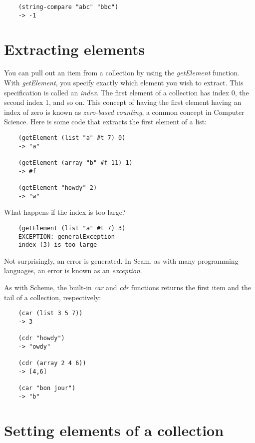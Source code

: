 \begin{verbatim}
    (string-compare "abc" "bbc")
    -> -1
\end{verbatim}

\section{Extracting elements}

You can pull out an item from a collection
by using the
{\it getElement} function.
With {\it getElement},
you specify exactly which element
you wish to extract. This specification is called an
{\it index}. The first element of a collection has index 0, the second
index 1, and so on. This concept of having the first element having
an index of zero is known as {\it zero-based counting}, a common concept
in Computer Science. Here is some code that extracts the first element
of a list:

\begin{verbatim}
    (getElement (list "a" #t 7) 0)
    -> "a"

    (getElement (array "b" #f 11) 1)
    -> #f

    (getElement "howdy" 2)
    -> "w"
\end{verbatim}

What happens if the index is too large?

\begin{verbatim}
    (getElement (list "a" #t 7) 3)
    EXCEPTION: generalException
    index (3) is too large
\end{verbatim}

Not surprisingly, an error is generated.
In Scam, as with many programming languages, an error is known
as an {\it exception}.

As with Scheme, the built-in {\it car} and {\it cdr} functions
returns the first item and the tail of a collection, respectively:

\begin{verbatim}
    (car (list 3 5 7))
    -> 3

    (cdr "howdy")
    -> "owdy"

    (cdr (array 2 4 6))
    -> [4,6]

    (car "bon jour")
    -> "b"
\end{verbatim}

\section{Setting elements of a collection}
\label{ListsStringsArraysSetting}

